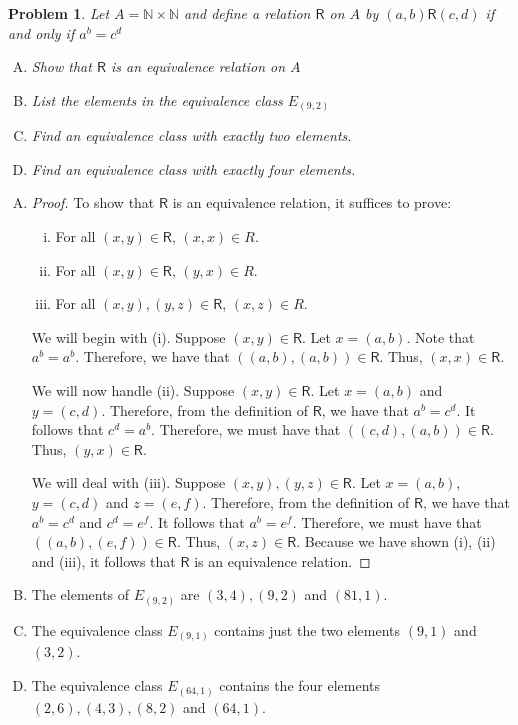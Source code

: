 \documentclass{article}
\newtheorem{problem}{Problem}
\begin{document}
\begin{problem}
Let $A = \mathbb{N} \times \mathbb{N}$ and define a relation $\mathsf{R}$ on $A$ by $(a,b)\mathsf{R}(c,d)$ if and only if $a^b=c^d$
\begin{enumerate}[A.]
\item Show that $\mathsf{R}$ is an equivalence relation on $A$
\item List the elements in the equivalence class $E_{(9,2)}$
\item Find an equivalence class with exactly two elements.
\item Find an equivalence class with exactly four elements.
\end{enumerate}

\medskip

\end{problem}
\begin{enumerate}[A.]
    \item \begin{proof}
        To show that $\mathsf{R}$ is an equivalence relation, it suffices to prove:
        \begin{enumerate}[(i)]
            \item For all $(x, y) \in \mathsf{R}$, $(x, x) \in R$.
            \item For all $(x, y) \in \mathsf{R}$, $(y, x) \in R$.
            \item For all $(x, y), (y, z) \in \mathsf{R}$, $(x, z) \in R$.
        \end{enumerate}
        
        We will begin with (i). Suppose $(x, y) \in \mathsf{R}$. Let $x = (a, b)$. Note that $a^b = a^b$. Therefore, we have that $((a, b), (a, b)) \in \mathsf{R}$. Thus, $(x, x) \in \mathsf{R}$.
        
        We will now handle (ii). Suppose $(x, y) \in \mathsf{R}$. Let $x = (a, b)$ and $y = (c, d)$. Therefore, from the definition of $\mathsf{R}$, we have that $a^b = c^d$. It follows that $c^d = a^b$. Therefore, we must have that $((c, d), (a, b)) \in \mathsf{R}$. Thus, $(y, x) \in \mathsf{R}$.
        
        We will deal with (iii). Suppose $(x, y), (y, z) \in \mathsf{R}$. Let $x = (a, b)$, $y = (c, d)$ and $z = (e, f)$. Therefore, from the definition of $\mathsf{R}$, we have that $a^b = c^d$ and $c^d = e^f$. It follows that $a^b = e^f$. Therefore, we must have that $((a, b), (e, f)) \in \mathsf{R}$. Thus, $(x, z) \in \mathsf{R}$. Because we have shown (i), (ii) and (iii), it follows that $\mathsf{R}$ is an equivalence relation.
    \end{proof}
    \item The elements of $E_{(9,2)}$ are $(3,4), (9,2)$ and $(81, 1)$.
    \item The equivalence class $E_{(9,1)}$ contains just the two elements $(9, 1)$ and $(3, 2)$.
    \item The equivalence class $E_{(64,1)}$ contains the four elements $(2, 6), (4, 3), (8, 2)$ and $(64, 1)$.
\end{enumerate}
\end{document}
